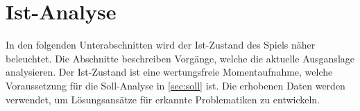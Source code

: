 \section{Ist-Analyse}\label{sec:ist}
In den folgenden Unterabschnitten wird der Ist-Zustand des Spiels näher beleuchtet\cite{grundlagen-grochla}. Die Abschnitte beschreiben Vorgänge, welche die aktuelle Ausganslage analysieren. Der Ist-Zustand ist eine wertungsfreie Momentaufnahme, welche Voraussetzung für die Soll-Analyse in \autoref{sec:soll} ist\cite{ist-zustand}. Die erhobenen Daten werden verwendet, um Lösungsansätze für erkannte Problematiken zu entwickeln. 